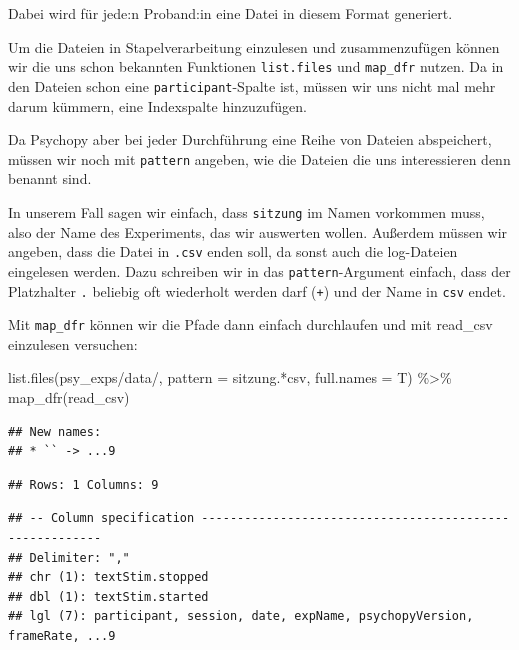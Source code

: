 \documentclass[
]{book}
\newenvironment{Shaded}{\begin{snugshade}}{\end{snugshade}}
\newcommand{\AttributeTok}[1]{\textcolor[rgb]{0.77,0.63,0.00}{#1}}
\newcommand{\FunctionTok}[1]{\textcolor[rgb]{0.00,0.00,0.00}{#1}}
\newcommand{\NormalTok}[1]{#1}
\newcommand{\SpecialCharTok}[1]{\textcolor[rgb]{0.00,0.00,0.00}{#1}}
\newcommand{\StringTok}[1]{\textcolor[rgb]{0.31,0.60,0.02}{#1}}
\begin{document}
Dabei wird für jede:n Proband:in eine Datei in diesem Format generiert.

Um die Dateien in Stapelverarbeitung einzulesen und zusammenzufügen können wir die uns schon bekannten Funktionen \texttt{list.files} und \texttt{map\_dfr} nutzen. Da in den Dateien schon eine \texttt{participant}-Spalte ist, müssen wir uns nicht mal mehr darum kümmern, eine Indexspalte hinzuzufügen.

Da Psychopy aber bei jeder Durchführung eine Reihe von Dateien abspeichert, müssen wir noch mit \texttt{pattern} angeben, wie die Dateien die uns interessieren denn benannt sind.

In unserem Fall sagen wir einfach, dass \texttt{sitzung} im Namen vorkommen muss, also der Name des Experiments, das wir auswerten wollen. Außerdem müssen wir angeben, dass die Datei in \texttt{.csv} enden soll, da sonst auch die log-Dateien eingelesen werden. Dazu schreiben wir in das \texttt{pattern}-Argument einfach, dass der Platzhalter \texttt{.} beliebig oft wiederholt werden darf (\texttt{+}) und der Name in \texttt{csv} endet.

Mit \texttt{map\_dfr} können wir die Pfade dann einfach durchlaufen und mit read\_csv einzulesen versuchen:

\begin{Shaded}
\begin{Highlighting}[]
\FunctionTok{list.files}\NormalTok{(}\StringTok{\textquotesingle{}psy\_exps/data/\textquotesingle{}}\NormalTok{,}
           \AttributeTok{pattern =} \StringTok{\textquotesingle{}sitzung.*csv\textquotesingle{}}\NormalTok{,}
           \AttributeTok{full.names =}\NormalTok{ T) }\SpecialCharTok{\%\textgreater{}\%} 
  \FunctionTok{map\_dfr}\NormalTok{(read\_csv)}
\end{Highlighting}
\end{Shaded}

\begin{verbatim}
## New names:
## * `` -> ...9
\end{verbatim}

\begin{verbatim}
## Rows: 1 Columns: 9
\end{verbatim}

\begin{verbatim}
## -- Column specification --------------------------------------------------------
## Delimiter: ","
## chr (1): textStim.stopped
## dbl (1): textStim.started
## lgl (7): participant, session, date, expName, psychopyVersion, frameRate, ...9
\end{verbatim}
\end{document}
